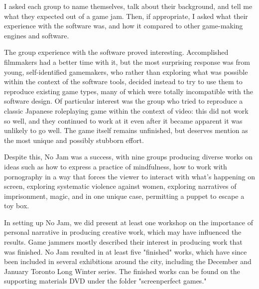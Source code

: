 I asked each group to name themselves, talk about their background, and tell me what they expected out of a game jam. Then, if appropriate, I asked what their experience with the software was, and how it compared to other game-making engines and software.

The group experience with the software proved interesting. Accomplished filmmakers had a better time with it, but the most surprising response was from young, self-identified gamemakers, who rather than exploring what was possible within the context of the software tools, decided instead to try to use them to reproduce existing game types, many of which were totally incompatible with the software design. Of particular interest was the group who tried to reproduce a classic Japanese roleplaying game within the context of video: this did not work so well, and they continued to work at it even after it became apparent it was unlikely to go well. The game itself remains unfinished, but deserves mention as the most unique and possibly stubborn effort.

Despite this, No Jam was a success, with nine groups producing diverse works on ideas such as how to express a practice of mindfulness, how to work with pornography in a way that forces the viewer to interact with what's happening on screen, exploring systematic violence against women, exploring narratives of imprisonment, magic, and in one unique case, permitting a puppet to escape a toy box. 

In setting up No Jam, we did present at least one workshop on the importance of personal narrative in producing creative work, which may have influenced the results. Game jammers mostly described their interest in producing work that was finished. No Jam resulted in at least five "finished" works, which have since been included in several exhibitions around the city, including the December and January Toronto Long Winter series. The finished works can be found on the supporting materials DVD under the folder "screenperfect games."